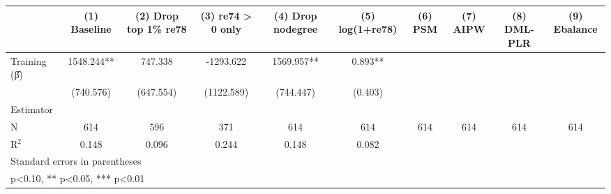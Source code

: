 \begin{table}[htbp]
\centering
\begin{tabular}{lccccccccc}
\hline\hline
 & (1) Baseline & (2) Drop top 1\% re78 & (3) re74 > 0 only & (4) Drop nodegree & (5) log(1+re78) & (6) PSM & (7) AIPW & (8) DML-PLR & (9) Ebalance \\
\hline
Training (β̂) & 1548.244** & 747.338 & -1293.622 & 1569.957** & 0.893** &  &  &  &  \\
 & (740.576) & (647.554) & (1122.589) & (744.447) & (0.403) &  &  &  &  \\
\hline
Estimator &  &  &  &  &  &  &  &  &  \\
N & 614 & 596 & 371 & 614 & 614 & 614 & 614 & 614 & 614 \\
R$^2$ & 0.148 & 0.096 & 0.244 & 0.148 & 0.082 &  &  &  &  \\
\hline\hline
\multicolumn{10}{l}{\footnotesize Standard errors in parentheses} \\
\multicolumn{10}{l}{\footnotesize * p<0.10, ** p<0.05, *** p<0.01} \\
\end{tabular}
\end{table}